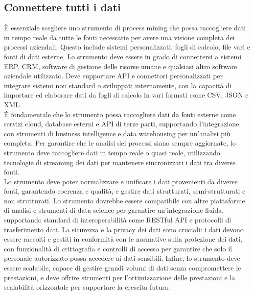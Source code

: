 \documentclass{article}
\begin{document}
\subsection{Connettere tutti i dati}
È essenziale scegliere uno strumento di process mining che possa raccogliere dati in tempo reale da tutte le fonti necessarie per avere una visione completa dei processi aziendali. Questo include sistemi personalizzati, fogli di calcolo, file vari e fonti di dati esterne. Lo strumento deve essere in grado di connettersi a sistemi ERP, CRM, software di gestione delle risorse umane e qualsiasi altro software aziendale utilizzato. Deve supportare API e connettori personalizzati per integrare sistemi non standard o sviluppati internamente, con la capacità di importare ed elaborare dati da fogli di calcolo in vari formati come CSV, JSON e XML.\\
É fondamentale che lo strumento possa raccogliere dati da fonti esterne come servizi cloud, database esterni e API di terze parti, supportando l'integrazione con strumenti di business intelligence e data warehousing per un'analisi più completa. Per garantire che le analisi dei processi siano sempre aggiornate, lo strumento deve raccogliere dati in tempo reale o quasi reale, utilizzando tecnologie di streaming dei dati per mantenere sincronizzati i dati tra diverse fonti.\\
Lo strumento deve poter normalizzare e unificare i dati provenienti da diverse fonti, garantendo coerenza e qualità, e gestire dati strutturati, semi-strutturati e non strutturati. Lo strumento dovrebbe essere compatibile con altre piattaforme di analisi e strumenti di data science per garantire un'integrazione fluida, supportando standard di interoperabilità come RESTful API e protocolli di trasferimento dati. La sicurezza e la privacy dei dati sono cruciali: i dati devono essere raccolti e gestiti in conformità con le normative sulla protezione dei dati, con funzionalità di crittografia e controlli di accesso per garantire che solo il personale autorizzato possa accedere ai dati sensibili. Infine, lo strumento deve essere scalabile, capace di gestire grandi volumi di dati senza compromettere le prestazioni, e deve offrire strumenti per l'ottimizzazione delle prestazioni e la scalabilità orizzontale per supportare la crescita futura.
\end{document}
